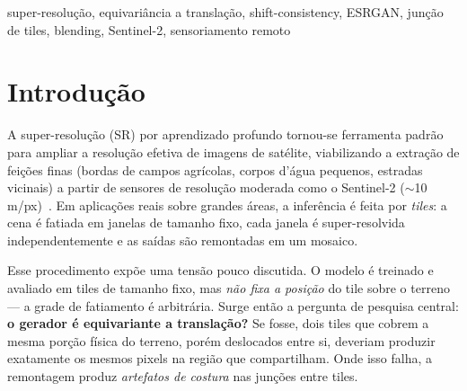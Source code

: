 \documentclass[conference]{IEEEtran}
\begin{document}
\begin{IEEEkeywords}
super-resolução, equivariância a translação, shift-consistency, ESRGAN, junção de tiles,
blending, Sentinel-2, sensoriamento remoto
\end{IEEEkeywords}

\section{Introdução}
A super-resolução (SR) por aprendizado profundo tornou-se ferramenta padrão para
ampliar a resolução efetiva de imagens de satélite, viabilizando a extração de feições
finas (bordas de campos agrícolas, corpos d'água pequenos, estradas vicinais) a partir
de sensores de resolução moderada como o Sentinel-2 ($\sim$10\,m/px)~\cite{b_sr_survey}.
Em aplicações reais sobre grandes áreas, a inferência é feita por \textit{tiles}: a
cena é fatiada em janelas de tamanho fixo, cada janela é super-resolvida
independentemente e as saídas são remontadas em um mosaico.

Esse procedimento expõe uma tensão pouco discutida. O modelo é treinado e avaliado em
tiles de tamanho fixo, mas \emph{não fixa a posição} do tile sobre o terreno --- a
grade de fatiamento é arbitrária. Surge então a pergunta de pesquisa central:
\textbf{o gerador é equivariante a translação?} Se fosse, dois tiles que cobrem a mesma
porção física do terreno, porém deslocados entre si, deveriam produzir exatamente os
mesmos pixels na região que compartilham. Onde isso falha, a remontagem produz
\emph{artefatos de costura} nas junções entre tiles.
\end{document}
